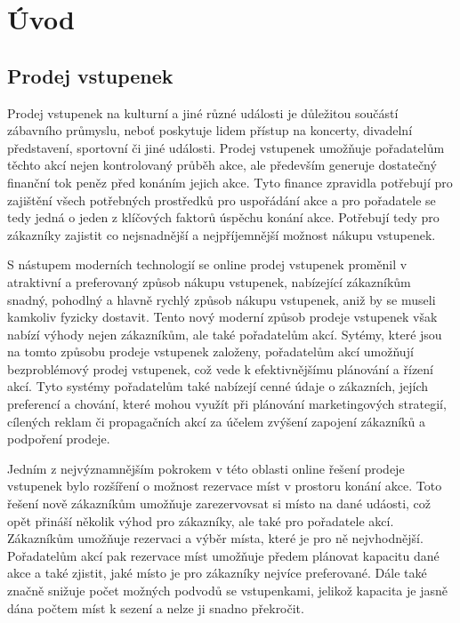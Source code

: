 \chapter*{Úvod}

\section*{Prodej vstupenek}
\label{sec:uvod-prodej-vstupenek}
Prodej vstupenek na kulturní a jiné různé události je důležitou součástí zábavního průmyslu, neboť poskytuje lidem přístup na koncerty, divadelní představení, sportovní či jiné události.
Prodej vstupenek umožňuje pořadatelům těchto akcí nejen kontrolovaný průběh akce, ale především generuje dostatečný finanční tok peněz před konáním jejich akce.
Tyto finance zpravidla potřebují pro zajištění všech potřebných prostředků pro uspořádání akce a pro pořadatele se tedy jedná o jeden z klíčových faktorů úspěchu konání akce.
Potřebují tedy pro zákazníky zajistit co nejsnadnější a nejpříjemnější možnost nákupu vstupenek.

S nástupem moderních technologií se online prodej vstupenek proměnil v atraktivní a preferovaný způsob nákupu vstupenek, nabízející zákazníkům snadný, pohodlný a hlavně rychlý způsob nákupu vstupenek, aniž by se museli kamkoliv fyzicky dostavit.
Tento nový moderní způsob prodeje vstupenek však nabízí výhody nejen zákazníkům, ale také pořadatelům akcí.
Sytémy, které jsou na tomto způsobu prodeje vstupenek založeny, pořadatelům akcí umožňují bezproblémový prodej vstupenek, což vede k efektivnějšímu plánování a řízení akcí.
Tyto systémy pořadatelům také nabízejí cenné údaje o zákazních, jejích preferencí a chování, které mohou využít při plánování marketingových strategií, cílených reklam či propagačních akcí za účelem zvýšení zapojení zákazníků a podpoření prodeje.

Jedním z nejvýznamnějším pokrokem v této oblasti online řešení prodeje vstupenek bylo rozšíření o možnost rezervace míst v prostoru konání akce.
Toto řešení nově zákazníkům umožňuje zarezervovsat si místo na dané udáosti, což opět přináší několik výhod pro zákazníky, ale také pro pořadatele akcí.
Zákazníkům umožňuje rezervaci a výběr místa, které je pro ně nejvhodnější.
Pořadatelům akcí pak rezervace míst umožňuje předem plánovat kapacitu dané akce a také zjistit, jaké místo je pro zákazníky nejvíce preferované.
Dále také značně snižuje počet možných podvodů se vstupenkami, jelikož kapacita je jasně dána počtem míst k sezení a nelze ji snadno překročit.

